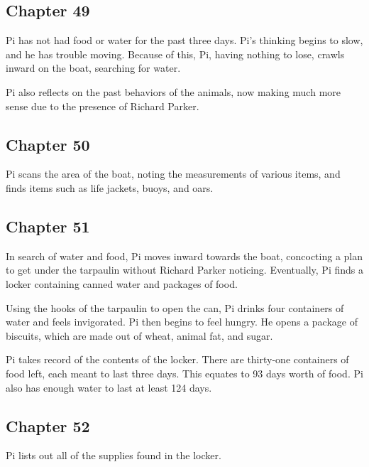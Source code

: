 \documentclass[11pt]{article}
\begin{document}
\subsection{Chapter 49}
\label{sec:orgbe9ff72}
Pi has not had food or water for the past three days. Pi's thinking begins to slow, and he has trouble moving. Because of this, Pi, having nothing to lose, crawls inward on the boat, searching for water.

Pi also reflects on the past behaviors of the animals, now making much more sense due to the presence of Richard Parker.
\subsection{Chapter 50}
\label{sec:orge315f54}
Pi scans the area of the boat, noting the measurements of various items, and finds items such as life jackets, buoys, and oars.
\subsection{Chapter 51}
\label{sec:orgd4b70ac}
In search of water and food, Pi moves inward towards the boat, concocting a plan to get under the tarpaulin without Richard Parker noticing. Eventually, Pi finds a locker containing canned water and packages of food.

Using the hooks of the tarpaulin to open the can, Pi drinks four containers of water and feels invigorated. Pi then begins to feel hungry. He opens a package of biscuits, which are made out of wheat, animal fat, and sugar.

Pi takes record of the contents of the locker. There are thirty-one containers of food left, each meant to last three days. This equates to 93 days worth of food. Pi also has enough water to last at least 124 days.
\subsection{Chapter 52}
\label{sec:orgd5d6303}
Pi lists out all of the supplies found in the locker.
\end{document}
